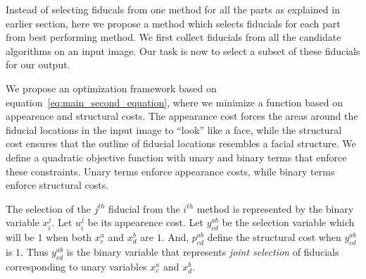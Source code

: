 \label{subsec:optimization}
Instead of selecting fiducals from one method for all the parts as explained in earlier section,
here we propose a method which selects fiducials for each part from best performing method. 
We first collect fiducials from all the candidate algorithms on an input image. Our task is now to
select a subset of these fiducials for our output. 

We propose an optimization framework based on equation~\ref{eq:main_second_equation},
 where we minimize a function based on appearence and structural
costs. The appearance cost forces the areas around the fiducial locations in the input image 
to ``look'' like a face, while the structural cost ensures that the outline of fiducial locations 
resembles a facial structure. We define a quadratic objective function with unary and binary terms
that enforce these constraints. Unary terms enforce appearance costs, while binary terms enforce
structural costs.

The selection of the $j^{th}$ fiducial from the
$i^{th}$ method is represented by the binary variable $x_i^j$.  Let $u_i^j$ be its
appearence cost. Let $y_{cd}^{ab}$ be the selection variable which will be $1$ when both $x_c^a$
and $x_d^b$ are $1$. And, $p_{cd}^{ab}$ define the structural cost when $y_{cd}^{ab}$ is $1$.
Thus $y^{ab}_{cd}$ is the binary variable that represents \emph{joint selection} of fiducials
corresponding to unary variables $x^a_c$ and $x^b_d$.

